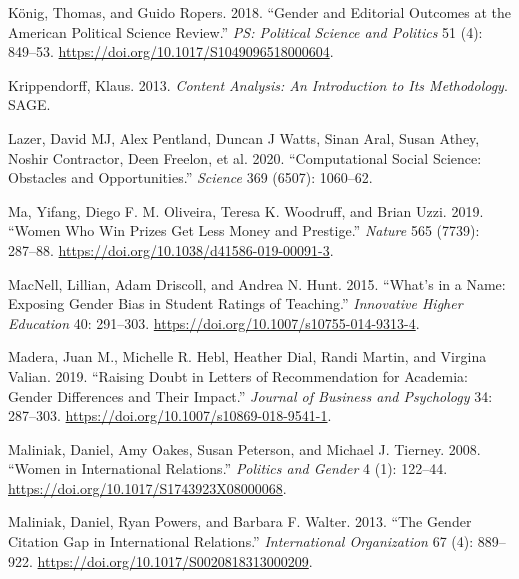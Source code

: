 \documentclass[
]{ccr}
\newlength{\cslhangindent}
\newlength{\cslentryspacingunit} %
\newenvironment{CSLReferences}[2] %
 {%
  \setlength{\parindent}{0pt}
  \ifodd #1
  \let\oldpar\par
  \def\par{\hangindent=\cslhangindent\oldpar}
  \fi
  \setlength{\parskip}{#2\cslentryspacingunit}
 }%
 {}
\begin{document}
\begin{CSLReferences}{1}{0}
\leavevmode{}%
König, Thomas, and Guido Ropers. 2018. {``Gender and {Editorial}
{Outcomes} at the {American} {Political} {Science} {Review}.''}
\emph{PS: Political Science and Politics} 51 (4): 849--53.
\url{https://doi.org/10.1017/S1049096518000604}.

\leavevmode{}%
Krippendorff, Klaus. 2013. \emph{Content {Analysis}: {An} {Introduction}
to {Its} {Methodology}}. SAGE.

\leavevmode{}%
Lazer, David MJ, Alex Pentland, Duncan J Watts, Sinan Aral, Susan Athey,
Noshir Contractor, Deen Freelon, et al. 2020. {``Computational Social
Science: {Obstacles} and Opportunities.''} \emph{Science} 369 (6507):
1060--62.

\leavevmode{}%
Ma, Yifang, Diego F. M. Oliveira, Teresa K. Woodruff, and Brian Uzzi.
2019. {``Women Who Win Prizes Get Less Money and Prestige.''}
\emph{Nature} 565 (7739): 287--88.
\url{https://doi.org/10.1038/d41586-019-00091-3}.

\leavevmode{}%
MacNell, Lillian, Adam Driscoll, and Andrea N. Hunt. 2015. {``What's in
a {Name}: {Exposing} {Gender} {Bias} in {Student} {Ratings} of
{Teaching}.''} \emph{Innovative Higher Education} 40: 291--303.
\url{https://doi.org/10.1007/s10755-014-9313-4}.

\leavevmode{}%
Madera, Juan M., Michelle R. Hebl, Heather Dial, Randi Martin, and
Virgina Valian. 2019. {``Raising {Doubt} in {Letters} of
{Recommendation} for {Academia}: {Gender} {Differences} and {Their}
{Impact}.''} \emph{Journal of Business and Psychology} 34: 287--303.
\url{https://doi.org/10.1007/s10869-018-9541-1}.

\leavevmode{}%
Maliniak, Daniel, Amy Oakes, Susan Peterson, and Michael J. Tierney.
2008. {``Women in {International} {Relations}.''} \emph{Politics and
Gender} 4 (1): 122--44. \url{https://doi.org/10.1017/S1743923X08000068}.

\leavevmode{}%
Maliniak, Daniel, Ryan Powers, and Barbara F. Walter. 2013. {``The
{Gender} {Citation} {Gap} in {International} {Relations}.''}
\emph{International Organization} 67 (4): 889--922.
\url{https://doi.org/10.1017/S0020818313000209}.


\end{CSLReferences}
\end{document}
